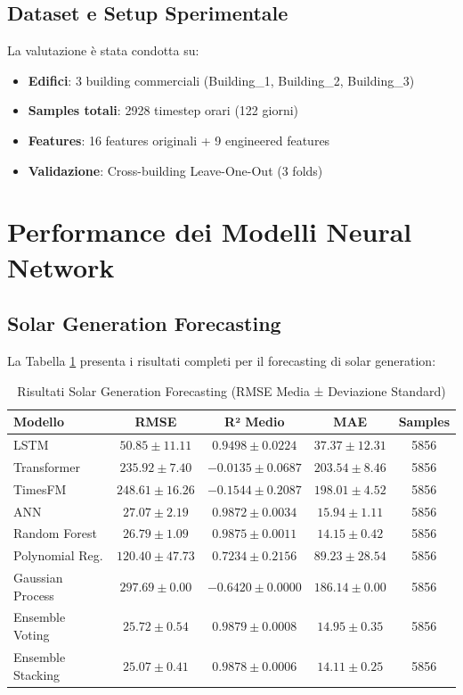 \documentclass[12pt,a4paper,twoside]{report}
\begin{document}
\subsection{Dataset e Setup Sperimentale}

La valutazione è stata condotta su:
\begin{itemize}
    \item \textbf{Edifici}: 3 building commerciali (Building\_1, Building\_2, Building\_3)
    \item \textbf{Samples totali}: 2928 timestep orari (122 giorni)
    \item \textbf{Features}: 16 features originali + 9 engineered features
    \item \textbf{Validazione}: Cross-building Leave-One-Out (3 folds)
\end{itemize}

\section{Performance dei Modelli Neural Network}

\subsection{Solar Generation Forecasting}

La Tabella \ref{tab:solar_results} presenta i risultati completi per il forecasting di solar generation:

\begin{table}[H]
\centering
\caption{Risultati Solar Generation Forecasting (RMSE Media ± Deviazione Standard)}
\label{tab:solar_results}
\begin{tabular}{lcccc}
\toprule
\textbf{Modello} & \textbf{RMSE} & \textbf{R² Medio} & \textbf{MAE} & \textbf{Samples} \\
\midrule
LSTM & $50.85 \pm 11.11$ & $0.9498 \pm 0.0224$ & $37.37 \pm 12.31$ & 5856 \\
Transformer & $235.92 \pm 7.40$ & $-0.0135 \pm 0.0687$ & $203.54 \pm 8.46$ & 5856 \\
TimesFM & $248.61 \pm 16.26$ & $-0.1544 \pm 0.2087$ & $198.01 \pm 4.52$ & 5856 \\
ANN & $27.07 \pm 2.19$ & $0.9872 \pm 0.0034$ & $15.94 \pm 1.11$ & 5856 \\
Random Forest & $26.79 \pm 1.09$ & $0.9875 \pm 0.0011$ & $14.15 \pm 0.42$ & 5856 \\
Polynomial Reg. & $120.40 \pm 47.73$ & $0.7234 \pm 0.2156$ & $89.23 \pm 28.54$ & 5856 \\
Gaussian Process & $297.69 \pm 0.00$ & $-0.6420 \pm 0.0000$ & $186.14 \pm 0.00$ & 5856 \\
Ensemble Voting & $25.72 \pm 0.54$ & $\mathbf{0.9879} \pm 0.0008$ & $14.95 \pm 0.35$ & 5856 \\
Ensemble Stacking & $\mathbf{25.07 \pm 0.41}$ & $0.9878 \pm 0.0006$ & $\mathbf{14.11 \pm 0.25}$ & 5856 \\
\bottomrule
\end{tabular}
\end{table}
\end{document}
